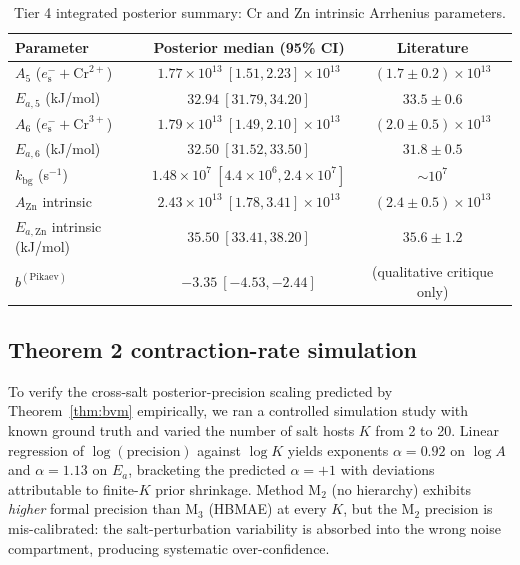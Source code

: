 \documentclass[12pt]{article}
\theoremstyle{plain}
\theoremstyle{definition}
\theoremstyle{remark}
\newcommand{\eS}{\ensuremath{e_{\mathrm{s}}^{-}}\xspace}
\newcommand{\HBMAE}{HBMAE\xspace}
\begin{document}
\begin{table}[ht]\centering
\caption{Tier 4 integrated posterior summary: Cr and Zn intrinsic Arrhenius parameters.}
\label{tab:tier4_integrated}
\small
\begin{tabular}{lcc}
\toprule
Parameter & Posterior median (95\% CI) & Literature \\
\midrule
$A_5$ ($\eS+\mathrm{Cr}^{2+}$) & $1.77\times 10^{13}\ [1.51,2.23]\times 10^{13}$ & $(1.7\pm 0.2)\times 10^{13}$ \\
$E_{a,5}$ (kJ/mol) & $32.94\ [31.79,34.20]$ & $33.5\pm 0.6$ \\
$A_6$ ($\eS+\mathrm{Cr}^{3+}$) & $1.79\times 10^{13}\ [1.49,2.10]\times 10^{13}$ & $(2.0\pm 0.5)\times 10^{13}$ \\
$E_{a,6}$ (kJ/mol) & $32.50\ [31.52,33.50]$ & $31.8\pm 0.5$ \\
$k_{\mathrm{bg}}$ (s$^{-1}$) & $1.48\times 10^{7}\ [4.4\times 10^{6},2.4\times 10^{7}]$ & $\sim 10^{7}$ \\
$A_{\mathrm{Zn}}$ intrinsic & $2.43\times 10^{13}\ [1.78,3.41]\times 10^{13}$ & $(2.4\pm 0.5)\times 10^{13}$ \\
$E_{a,\mathrm{Zn}}$ intrinsic (kJ/mol) & $35.50\ [33.41,38.20]$ & $35.6\pm 1.2$ \\
$b^{(\mathrm{Pikaev})}$ & $-3.35\ [-4.53,-2.44]$ & (qualitative critique only) \\
\bottomrule
\end{tabular}
\end{table}

\subsection{Theorem 2 contraction-rate simulation}\label{sec:val:contraction}

To verify the cross-salt posterior-precision scaling predicted by
Theorem~\ref{thm:bvm} empirically, we ran a controlled simulation study with
known ground truth and varied the number of salt hosts $K$ from 2 to 20.
Linear regression of $\log(\text{precision})$ against $\log K$ yields
exponents $\alpha = 0.92$ on $\log A$ and $\alpha = 1.13$ on $E_a$,
bracketing the predicted $\alpha = +1$ with deviations attributable to
finite-$K$ prior shrinkage.  Method M$_2$ (no hierarchy) exhibits
\emph{higher} formal precision than M$_3$ (\HBMAE) at every $K$, but the
M$_2$ precision is mis-calibrated:  the salt-perturbation variability is
absorbed into the wrong noise compartment, producing systematic
over-confidence.
\end{document}
